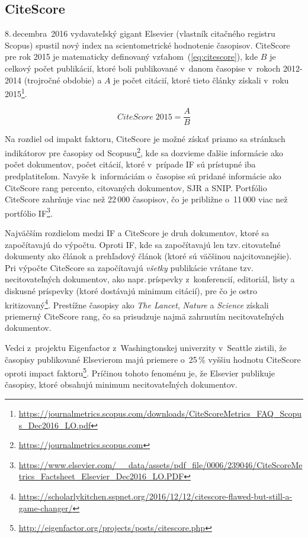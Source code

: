 \subsection{CiteScore}
\label{sec:citescore}

8.\,decembra~2016 vydavateľský gigant Elsevier (vlastník citačného registru
Scopus) spustil nový index na scientometrické hodnotenie časopisov.  CiteScore
pre rok 2015 je matematicky definovaný vzťahom~(\ref{eq:citescore}), kde $B$ je
celkový počet publikácií, ktoré boli publikované v~danom časopise v~rokoch
2012-2014 (trojročné obdobie) a $A$ je počet citácií, ktoré tieto články získali
v~roku
2015\footnote{\url{https://journalmetrics.scopus.com/downloads/CiteScoreMetrics_FAQ_Scopus_Dec2016_LO.pdf}}.

\begin{equation}
\label{eq:citescore}
CiteScore\; 2015 = \frac{A}{B}
\end{equation}

Na rozdiel od impakt faktoru, CiteScore je možné získať priamo sa stránkach
indikátorov pre časopisy od
Scopusu\footnote{\url{https://journalmetrics.scopus.com}}, kde sa dozvieme
ďalšie informácie ako počet dokumentov, počet citácií, ktoré v~prípade IF sú
prístupné iba predplatiteľom.  Navyše k~informáciám o~časopise sú pridané
informácie ako CiteScore rang percento, citovaných dokumentov, SJR a SNIP.
Portfólio CiteScore zahrňuje viac než 22\,000 časopisov, čo je približne
o~11\,000 viac než portfólio
IF\footnote{\url{https://www.elsevier.com/__data/assets/pdf_file/0006/239046/CiteScoreMetrics_Factsheet_Elsevier_Dec2016_LO.PDF}}.

Najväčším rozdielom medzi IF a CiteScore je druh dokumentov, ktoré sa
započítavajú do výpočtu.  Oproti IF, kde sa započítavajú len tzv.\,citovateľné
dokumenty ako článok a prehľadový článok (ktoré sú väčšinou najcitovanejšie).
Pri výpočte CiteScore sa započítavajú \emph{všetky} publikácie vrátane
tzv.\,necitovateľných dokumentov, ako napr.\,príspevky z~konferencií, editoriál,
listy a diskusné príspevky (ktoré dostávajú minimum citácií), pre čo je ostro
kritizovaný\footnote{\url{https://scholarlykitchen.sspnet.org/2016/12/12/citescore-flawed-but-still-a-game-changer/}}.
Prestížne časopisy ako \emph{The Lancet}, \emph{Nature} a \emph{Science} získali
priemerný CiteScore rang, čo sa prisudzuje najmä zahrnutím necitovateľných
dokumentov.

Vedci z~projektu Eigenfactor z~Washingtonskej univerzity v~Seattle zistili, že
časopisy publikované Elsevierom majú priemere o~25\,\% vyššiu hodnotu CiteScore
oproti impact
faktoru\footnote{\url{http://eigenfactor.org/projects/posts/citescore.php}}.
Príčinou tohoto fenoménu je, že Elsevier publikuje časopisy, ktoré obsahujú
minimum necitovateľných dokumentov.

